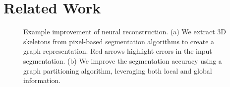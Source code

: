 
\section{Related Work}

\begin{figure}[t]
 	\caption{Example improvement of neural reconstruction. (a) We extract 3D skeletons from pixel-based segmentation algorithms to create a graph representation. Red arrows highlight errors in the input segmentation. (b) We improve the segmentation accuracy using a graph partitioning algorithm, leveraging both local and global information.}
 	\label{fig:improved-reconstruction}
\end{figure}

